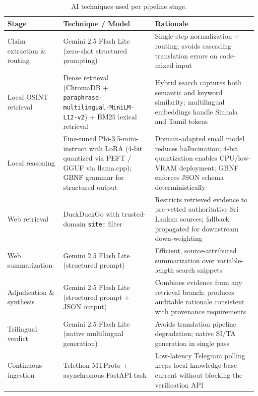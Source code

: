 \documentclass[12pt,a4paper]{article}
\begin{document}
\begin{table}[H]
\centering
\caption{AI techniques used per pipeline stage.}
\label{tab:techniques}
\renewcommand{\arraystretch}{1.3}
\begin{tabular}{|p{3.5cm}|p{4.5cm}|p{5.5cm}|}
\hline
\textbf{Stage} & \textbf{Technique / Model} & \textbf{Rationale} \\
\hline
Claim extraction \& routing &
  Gemini 2.5 Flash Lite (zero-shot structured prompting) &
  Single-step normalization + routing; avoids cascading translation errors on
  code-mixed input~\cite{vykopal} \\
\hline
Local OSINT retrieval &
  Dense retrieval (ChromaDB + \texttt{paraphrase-multilingual-MiniLM-L12-v2}) +
  BM25 lexical retrieval &
  Hybrid search captures both semantic and keyword similarity; multilingual
  embeddings handle Sinhala and Tamil tokens \\
\hline
Local reasoning &
  Fine-tuned Phi-3.5-mini-instruct with LoRA (4-bit quantized via PEFT /
  GGUF via llama.cpp); GBNF grammar for structured output &
  Domain-adapted small model reduces hallucination; 4-bit quantization
  enables CPU/low-VRAM deployment; GBNF enforces JSON schema
  deterministically \\
\hline
Web retrieval &
  DuckDuckGo with trusted-domain \texttt{site:} filter &
  Restricts retrieved evidence to pre-vetted authoritative Sri Lankan sources;
  fallback propagated for downstream down-weighting \\
\hline
Web summarization &
  Gemini 2.5 Flash Lite (structured prompt) &
  Efficient, source-attributed summarization over variable-length search
  snippets \\
\hline
Adjudication \& synthesis &
  Gemini 2.5 Flash Lite (structured prompt + JSON output) &
  Combines evidence from any retrieval branch; produces auditable rationale
  consistent with provenance requirements~\cite{gautam} \\
\hline
Trilingual verdict &
  Gemini 2.5 Flash Lite (native multilingual generation) &
  Avoids translation pipeline degradation; native SI/TA generation in single
  pass~\cite{vykopal} \\
\hline
Continuous ingestion &
  Telethon MTProto + asynchronous FastAPI task &
  Low-latency Telegram polling keeps local knowledge base current without
  blocking the verification API \\
\hline
\end{tabular}
\end{table}
\end{document}
